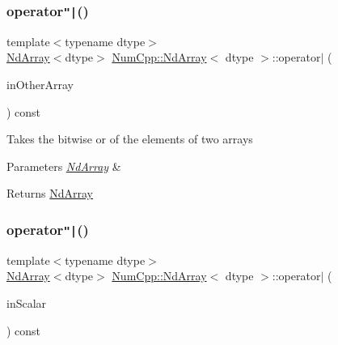 \subsubsection{\texorpdfstring{operator\texttt{"|}()}{operator|()}\hspace{0.1cm}{\footnotesize\ttfamily [1/2]}}
{\footnotesize\ttfamily template$<$typename dtype$>$ \\
\mbox{\hyperlink{class_num_cpp_1_1_nd_array}{Nd\+Array}}$<$dtype$>$ \mbox{\hyperlink{class_num_cpp_1_1_nd_array}{Num\+Cpp\+::\+Nd\+Array}}$<$ dtype $>$\+::operator$\vert$ (\begin{DoxyParamCaption}\item[{const \mbox{\hyperlink{class_num_cpp_1_1_nd_array}{Nd\+Array}}$<$ dtype $>$ \&}]{in\+Other\+Array }\end{DoxyParamCaption}) const\hspace{0.3cm}{\ttfamily [inline]}}

Takes the bitwise or of the elements of two arrays


\begin{DoxyParams}{Parameters}
{\em \mbox{\hyperlink{class_num_cpp_1_1_nd_array}{Nd\+Array}}} & \\
\hline
\end{DoxyParams}
\begin{DoxyReturn}{Returns}
\mbox{\hyperlink{class_num_cpp_1_1_nd_array}{Nd\+Array}} 
\end{DoxyReturn}
\mbox{\label{class_num_cpp_1_1_nd_array_a69a9c4030e65217685e7cb6b03d6eba2}} 
\subsubsection{\texorpdfstring{operator\texttt{"|}()}{operator|()}\hspace{0.1cm}{\footnotesize\ttfamily [2/2]}}
{\footnotesize\ttfamily template$<$typename dtype$>$ \\
\mbox{\hyperlink{class_num_cpp_1_1_nd_array}{Nd\+Array}}$<$dtype$>$ \mbox{\hyperlink{class_num_cpp_1_1_nd_array}{Num\+Cpp\+::\+Nd\+Array}}$<$ dtype $>$\+::operator$\vert$ (\begin{DoxyParamCaption}\item[{dtype}]{in\+Scalar }\end{DoxyParamCaption}) const\hspace{0.3cm}{\ttfamily [inline]}}

